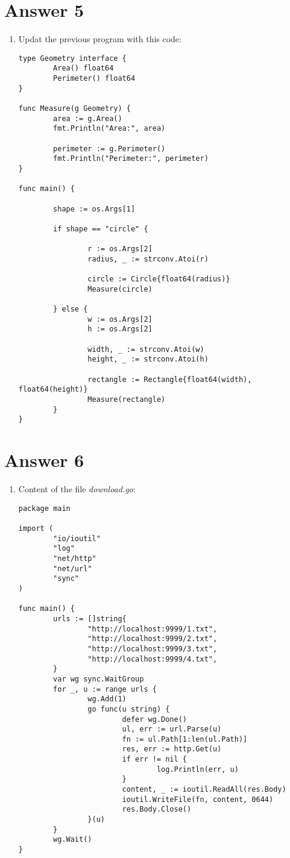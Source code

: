 \documentclass[11pt,a4paper]{article}
\begin{document}
\section*{Answer 5}
\begin{enumerate}
\item Updat the previous program with this code:
\begin{verbatim}
type Geometry interface {
        Area() float64
        Perimeter() float64
}

func Measure(g Geometry) {
        area := g.Area()
        fmt.Println("Area:", area)

        perimeter := g.Perimeter()
        fmt.Println("Perimeter:", perimeter)
}

func main() {

        shape := os.Args[1]

        if shape == "circle" {

                r := os.Args[2]
                radius, _ := strconv.Atoi(r)

                circle := Circle{float64(radius)}
                Measure(circle)

        } else {
                w := os.Args[2]
                h := os.Args[2]

                width, _ := strconv.Atoi(w)
                height, _ := strconv.Atoi(h)

                rectangle := Rectangle{float64(width), float64(height)}
                Measure(rectangle)
        }
}
\end{verbatim}

\end{enumerate}

\section*{Answer 6}
\begin{enumerate}
\item Content of the file {\it download.go}:
\begin{verbatim}
package main

import (
        "io/ioutil"
        "log"
        "net/http"
        "net/url"
        "sync"
)

func main() {
        urls := []string{
                "http://localhost:9999/1.txt",
                "http://localhost:9999/2.txt",
                "http://localhost:9999/3.txt",
                "http://localhost:9999/4.txt",
        }
        var wg sync.WaitGroup
        for _, u := range urls {
                wg.Add(1)
                go func(u string) {
                        defer wg.Done()
                        ul, err := url.Parse(u)
                        fn := ul.Path[1:len(ul.Path)]
                        res, err := http.Get(u)
                        if err != nil {
                                log.Println(err, u)
                        }
                        content, _ := ioutil.ReadAll(res.Body)
                        ioutil.WriteFile(fn, content, 0644)
                        res.Body.Close()
                }(u)
        }
        wg.Wait()
}
\end{verbatim}
\end{enumerate}
\end{document}
